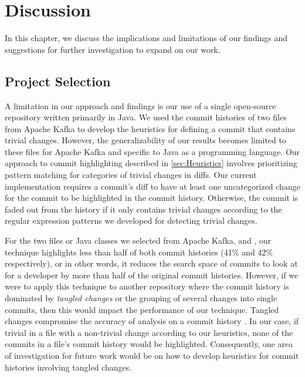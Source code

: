 \chapter{Discussion}
\label{ch:Discussion}


In this chapter, we discuss the implications and limitations of our findings 
and  suggestions for further investigation to expand on our work.


\section{Project Selection}

A limitation in our approach and findings is our use of a single open-source repository written primarily in Java.
We used the commit histories of two files from Apache Kafka to develop the heuristics for defining a commit that contains trivial changes.
However, the generalizability of our results becomes limited to these files for Apache Kafka and specific to Java as a programming language.
Our approach to commit highlighting described in \autoref{sec:Heuristics}
involves prioritizing pattern matching for categories of trivial changes in diffs.
Our current implementation requires a commit's diff to have at least one uncategorized change
for the commit to be highlighted in the commit history.
Otherwise, the commit is faded out from the history if it only contains trivial changes according to the regular expression patterns
we developed for detecting trivial changes.

For the two files or Java classes we selected from Apache Kafka,
 and ,
our technique highlights less than half of both commit histories (41\% and 42\% respectively),
or in other words, it reduces the search space of commits to look at for a developer 
by more than half of the original commit histories.
However, if we were to apply this technique to another repository where the commit history is 
dominated by \emph{tangled changes} or the grouping of several changes into single commits, 
then this would impact the performance of our technique.
Tangled changes compromise the accuracy of analysis on a commit history \cite{herzig_tangled_2013}.
In our case, if trivial  in a file  with a non-trivial change  according to our heuristics,
none of the commits in a file's commit history would be highlighted.
Consequently, one area of investigation for future work would be on how to
develop heuristics for commit histories involving tangled changes.


